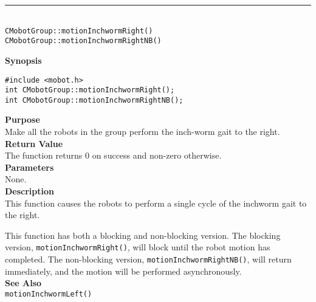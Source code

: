 \noindent
\vspace{5pt}
\rule{4.5in}{0.015in}\\
\noindent
{\LARGE \texttt{CMobotGroup::motionInchwormRight()}}\\
{\LARGE \texttt{CMobotGroup::motionInchwormRightNB()}}\\
{}

\noindent
{\bf Synopsis}\\
\begin{verbatim}
#include <mobot.h>
int CMobotGroup::motionInchwormRight();
int CMobotGroup::motionInchwormRightNB();
\end{verbatim}

\noindent
{\bf Purpose}\\
Make all the robots in the group perform the inch-worm gait to the right.\\

\noindent
{\bf Return Value}\\
The function returns 0 on success and non-zero otherwise.\\

\noindent
{\bf Parameters}\\
None.\\

\noindent
{\bf Description}\\
This function causes the robots to perform a single cycle of the inchworm gait
to the right. 

This function has both a blocking and non-blocking version.
The blocking version, \texttt{motionInchwormRight()}, will block until the
robot motion has completed. The non-blocking version, \texttt{motionInchwormRightNB()},
will return immediately, and the motion will be performed asynchronously.\\

\noindent
{\bf See Also}\\
\texttt{motionInchwormLeft()}

